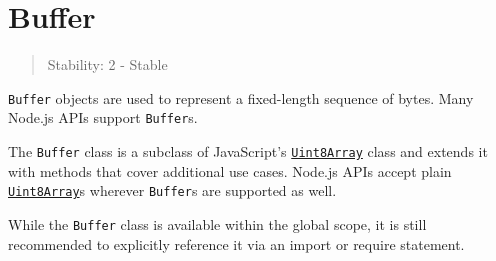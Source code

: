 \section{Buffer}\label{buffer}

\begin{quote}
Stability: 2 - Stable
\end{quote}

\texttt{Buffer} objects are used to represent a fixed-length sequence of
bytes. Many Node.js APIs support \texttt{Buffer}s.

The \texttt{Buffer} class is a subclass of JavaScript's
\href{https://developer.mozilla.org/en-US/docs/Web/JavaScript/Reference/Global_Objects/Uint8Array}{\texttt{Uint8Array}}
class and extends it with methods that cover additional use cases.
Node.js APIs accept plain
\href{https://developer.mozilla.org/en-US/docs/Web/JavaScript/Reference/Global_Objects/Uint8Array}{\texttt{Uint8Array}}s
wherever \texttt{Buffer}s are supported as well.

While the \texttt{Buffer} class is available within the global scope, it
is still recommended to explicitly reference it via an import or require
statement.

